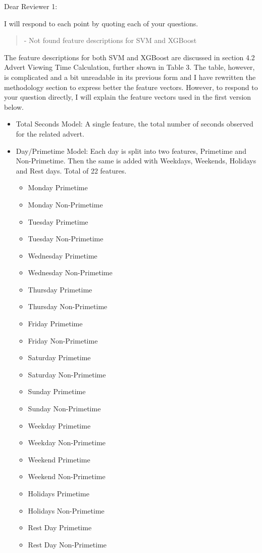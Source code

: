 \documentclass[review]{elsarticle}
\begin{document}
Dear Reviewer 1:

I will respond to each point by quoting each of your questions.

\begin{quotation}
- Not found feature descriptions for SVM and XGBoost 
\end{quotation}

The feature descriptions for both SVM and XGBoost are discussed in section 4.2 Advert Viewing Time Calculation, further shown in Table 3. The table, however, is complicated and a bit unreadable in its previous form and I have rewritten the methodology section to express better the feature vectors. However, to respond to your question directly, I will explain the feature vectors used in the first version below.

\begin{itemize}
    \item{Total Seconds Model: A single feature, the total number of seconds observed for the related advert.}

    \item{Day/Primetime Model: Each day is split into two features, Primetime and Non-Primetime. Then the same is added with Weekdays, Weekends, Holidays and Rest days. Total of 22 features.}

    \begin{itemize}
        \item Monday Primetime
        \item Monday Non-Primetime
        \item Tuesday Primetime
        \item Tuesday Non-Primetime
        \item Wednesday Primetime
        \item Wednesday Non-Primetime
        \item Thursday Primetime
        \item Thursday Non-Primetime
        \item Friday Primetime
        \item Friday Non-Primetime
        \item Saturday Primetime
        \item Saturday Non-Primetime
        \item Sunday Primetime
        \item Sunday Non-Primetime
        \item Weekday Primetime
        \item Weekday Non-Primetime
        \item Weekend Primetime
        \item Weekend Non-Primetime
        \item Holidays Primetime
        \item Holidays Non-Primetime
        \item Rest Day Primetime
        \item Rest Day Non-Primetime
    \end{itemize}
\end{itemize}
\end{document}
